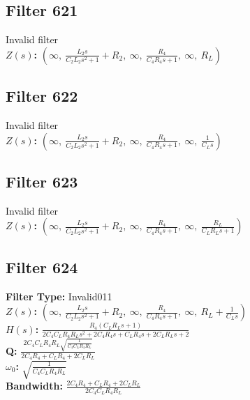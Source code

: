 \documentclass{article}
\begin{document}
\subsection*{Filter 621}
Invalid filter \\ 
\textbf{$Z(s)$:} $\left( \infty, \  \frac{L_{2} s}{C_{2} L_{2} s^{2} + 1} + R_{2}, \  \infty, \  \frac{R_{4}}{C_{4} R_{4} s + 1}, \  \infty, \  R_{L}\right)$ \\ 
\subsection*{Filter 622}
Invalid filter \\ 
\textbf{$Z(s)$:} $\left( \infty, \  \frac{L_{2} s}{C_{2} L_{2} s^{2} + 1} + R_{2}, \  \infty, \  \frac{R_{4}}{C_{4} R_{4} s + 1}, \  \infty, \  \frac{1}{C_{L} s}\right)$ \\ 
\subsection*{Filter 623}
Invalid filter \\ 
\textbf{$Z(s)$:} $\left( \infty, \  \frac{L_{2} s}{C_{2} L_{2} s^{2} + 1} + R_{2}, \  \infty, \  \frac{R_{4}}{C_{4} R_{4} s + 1}, \  \infty, \  \frac{R_{L}}{C_{L} R_{L} s + 1}\right)$ \\ 
\subsection*{Filter 624}
\textbf{Filter Type:} Invalid011 \\ 
\textbf{$Z(s)$:} $\left( \infty, \  \frac{L_{2} s}{C_{2} L_{2} s^{2} + 1} + R_{2}, \  \infty, \  \frac{R_{4}}{C_{4} R_{4} s + 1}, \  \infty, \  R_{L} + \frac{1}{C_{L} s}\right)$ \\ 
\textbf{$H(s)$:} $\frac{R_{4} \left(C_{L} R_{L} s + 1\right)}{2 C_{4} C_{L} R_{4} R_{L} s^{2} + 2 C_{4} R_{4} s + C_{L} R_{4} s + 2 C_{L} R_{L} s + 2}$ \\ 
\textbf{Q:} $\frac{2 C_{4} C_{L} R_{4} R_{L} \sqrt{\frac{1}{C_{4} C_{L} R_{4} R_{L}}}}{2 C_{4} R_{4} + C_{L} R_{4} + 2 C_{L} R_{L}}$ \\ 
\textbf{$\omega_0$:} $\sqrt{\frac{1}{C_{4} C_{L} R_{4} R_{L}}}$ \\ 
\textbf{Bandwidth:} $\frac{2 C_{4} R_{4} + C_{L} R_{4} + 2 C_{L} R_{L}}{2 C_{4} C_{L} R_{4} R_{L}}$ \\ 
\end{document}
